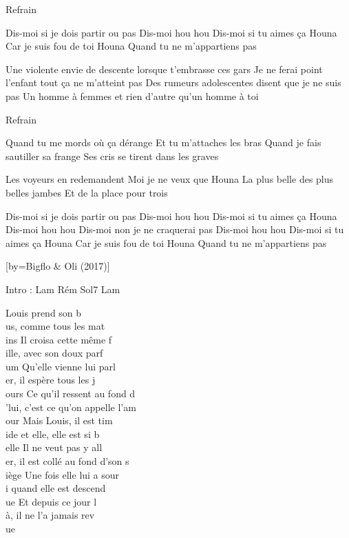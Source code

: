 \beginverse
Refrain
\endverse

\beginverse
Dis-moi si je dois partir ou pas
Dis-moi hou hou
Dis-moi si tu aimes ça Houna
Car je suis fou de toi Houna
Quand tu ne m'appartiens pas
\endverse

\beginverse
Une violente envie de descente lorsque t'embrasse ces gars
Je ne ferai point l'enfant tout ça ne m'atteint pas
Des rumeurs adolescentes disent que je ne suis pas
Un homme à femmes et rien d'autre qu'un homme à toi
\endverse

\beginverse
Refrain
\endverse

\beginverse
Quand tu me mords où ça dérange
Et tu m'attaches les bras
Quand je fais sautiller sa frange
Ses cris se tirent dans les graves
\endverse

\beginverse
Les voyeurs en redemandent
Moi je ne veux que Houna
La plus belle des plus belles jambes
Et de la place pour trois
\endverse

\beginverse
Dis-moi si je dois partir ou pas
Dis-moi hou hou
Dis-moi si tu aimes ça Houna
Dis-moi hou hou
Dis-moi non je ne craquerai pas
Dis-moi hou hou
Dis-moi si tu aimes ça Houna
Car je suis fou de toi Houna
Quand tu ne m'appartiens pas
\endverse

[by={Bigflo & Oli (2017)}]

\beginverse
Intro : Lam Rém Sol7 Lam
\endverse

\beginverse
Louis prend son b\\[Lam]us, comme tous les mat\\[Rém]ins
Il croisa cette même f\\[Sol7]ille, avec son doux parf\\[Lam]um
Qu'elle vienne lui parl\\[Lam]er, il espère tous les j\\[Rém]ours
Ce qu'il ressent au fond d\\[Sol7]'lui, c'est ce qu'on appelle l'am\\[Lam]our
Mais Louis, il est tim\\[Lam]ide et elle, elle est si b\\[Rém]elle
Il ne veut pas y all\\[Sol7]er, il est collé au fond d'son s\\[Lam]iège
Une fois elle lui a sour\\[Lam]i quand elle est descend\\[Rém]ue
Et depuis ce jour l\\[Sol7]à, il ne l'a jamais rev\\[Lam]ue
\endverse


